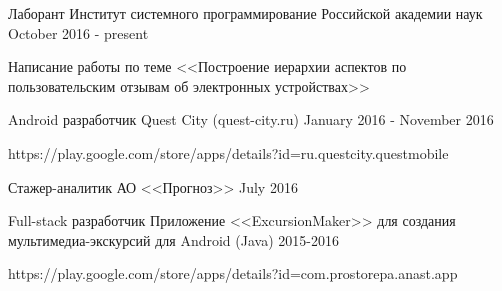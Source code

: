 


\begin{cventries}
	

\cventry
{Лаборант} %
{Институт системного программирование Российской академии наук} %
{} %
{October  2016 - present} %
{ %
	\begin{cvitems}
		\item {Написание работы по теме <<Построение иерархии аспектов по пользовательским отзывам об электронных устройствах>>}
	\end{cvitems}
}


\cventry
{Android разработчик} %
{Quest City (quest-city.ru)} %
{} %
{January 2016 - November 2016} %
{ %
 \begin{cvitems}
\item {https://play.google.com/store/apps/details?id=ru.questcity.questmobile}
 \end{cvitems}
}


\cventry
{Стажер-аналитик} %
{АО <<Прогноз>>} %
{} %
{July 2016} %
{ %
}



\cventry
{Full-stack разработчик} %
{Приложение <<ExcursionMaker>> для создания мультимедиа-экскурсий для Android (Java) } %
{} %
{2015-2016} %
{ %
 \begin{cvitems}
\item {https://play.google.com/store/apps/details?id=com.prostorepa.anast.app}
 \end{cvitems}
}


\end{cventries}
